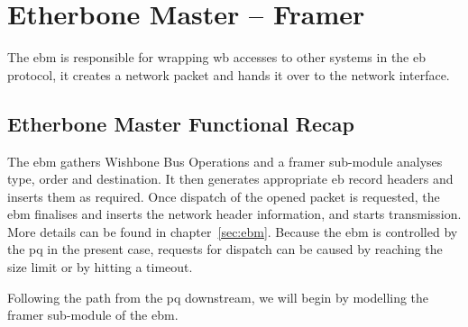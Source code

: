 \section{Etherbone Master -- Framer}
\label{sec:ebmf}

The \gls{ebm} is responsible for wrapping \gls{wb} accesses to other systems in the \gls{eb} protocol, it creates a network packet and hands it over to the network interface.

\subsection{Etherbone Master Functional Recap}

The \gls{ebm} gathers Wishbone Bus Operations and a framer sub-module analyses type, order and destination. It then generates appropriate \gls{eb} record headers and inserts them
as required. Once dispatch of the opened packet is requested, the \gls{ebm} finalises and inserts the network header information, and starts transmission. 
More details can be found in chapter~\ref{sec:ebm}.
Because the \gls{ebm} is controlled by the \gls{pq} in the present case, requests for dispatch can be caused by reaching the size limit or by hitting a timeout.
\par
Following the path from the \gls{pq} downstream, we will begin by modelling the framer sub-module of the \gls{ebm}.

